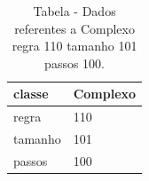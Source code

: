 \begin{table}[H]
\centering
\caption{Tabela - Dados referentes a Complexo regra 110 tamanho 101 passos 100.}
\label{tab:Complexo_regra_110_tamanho_101_passos_100}
\begin{tabular}{ll}
\toprule
classe & Complexo \\
\midrule
regra & 110 \\
tamanho & 101 \\
passos & 100 \\
\bottomrule
\end{tabular}

\end{table}
